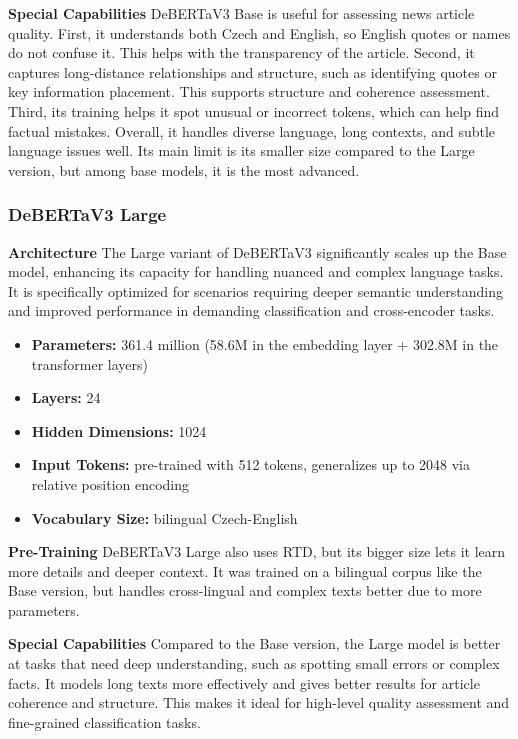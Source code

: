 \textbf{Special Capabilities}
\ac{DeBERTaV3} Base is useful for assessing news article quality. First, it understands both Czech and English, so English quotes or names do not confuse it. This helps with the transparency of the article. Second, it captures long-distance relationships and structure, such as identifying quotes or key information placement. This supports structure and coherence assessment. Third, its training helps it spot unusual or incorrect tokens, which can help find factual mistakes. Overall, it handles diverse language, long contexts, and subtle language issues well. Its main limit is its smaller size compared to the Large version, but among base models, it is the most advanced.

\subsubsection{\ac{DeBERTaV3} Large}
\textbf{Architecture}
The Large variant of \ac{DeBERTaV3} significantly scales up the Base model, enhancing its capacity for handling nuanced and complex language tasks. It is specifically optimized for scenarios requiring deeper semantic understanding and improved performance in demanding classification and cross-encoder tasks.
\begin{itemize}
  \item \textbf{Parameters:} 361.4 million (58.6M in the embedding layer + 302.8M in the transformer layers)
  \item \textbf{Layers:} 24
  \item \textbf{Hidden Dimensions:} 1024
  \item \textbf{Input Tokens:} pre-trained with 512 tokens, generalizes up to 2048 via relative position encoding
  \item \textbf{Vocabulary Size:} bilingual Czech-English
\end{itemize}

\textbf{Pre-Training}
\ac{DeBERTaV3} Large also uses \ac{RTD}, but its bigger size lets it learn more details and deeper context. It was trained on a bilingual corpus like the Base version, but handles cross-lingual and complex texts better due to more parameters.

\textbf{Special Capabilities}
Compared to the Base version, the Large model is better at tasks that need deep understanding, such as spotting small errors or complex facts. It models long texts more effectively and gives better results for article coherence and structure. This makes it ideal for high-level quality assessment and fine-grained classification tasks.

